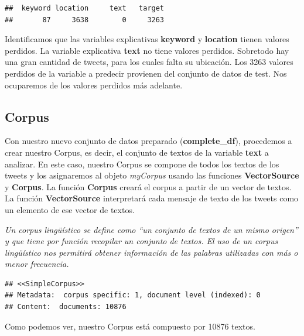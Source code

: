 \documentclass[]{article}
\newenvironment{Shaded}{\begin{snugshade}}{\end{snugshade}}
\newcommand{\KeywordTok}[1]{\textcolor[rgb]{0.13,0.29,0.53}{\textbf{#1}}}
\newcommand{\NormalTok}[1]{#1}
\newcommand{\OperatorTok}[1]{\textcolor[rgb]{0.81,0.36,0.00}{\textbf{#1}}}
\newcommand{\StringTok}[1]{\textcolor[rgb]{0.31,0.60,0.02}{#1}}
\begin{document}
\begin{verbatim}
##  keyword location     text   target 
##       87     3638        0     3263
\end{verbatim}

Identificamos que las variables explicativas \textbf{keyword} y
\textbf{location} tienen valores perdidos. La variable explicativa
\textbf{text} no tiene valores perdidos. Sobretodo hay una gran cantidad
de tweets, para los cuales falta su ubicación. Los 3263 valores perdidos
de la variable a predecir provienen del conjunto de datos de test. Nos
ocuparemos de los valores perdidos más adelante.

\hypertarget{corpus}{%
\subsection{Corpus}\label{corpus}}

Con nuestro nuevo conjunto de datos preparado (\textbf{complete\_df}),
procedemos a crear nuestro Corpus, es decir, el conjunto de textos de la
variable \textbf{text} a analizar. En este caso, nuestro Corpus se
compone de todos los textos de los tweets y los asignaremos al objeto
\emph{myCorpus} usando las funciones \textbf{VectorSource} y
\textbf{Corpus}. La función \textbf{Corpus} creará el corpus a partir de
un vector de textos. La función \textbf{VectorSource} interpretará cada
mensaje de texto de los tweets como un elemento de ese vector de textos.

\emph{Un corpus lingüístico se define como ``un conjunto de textos de un
mismo origen'' y que tiene por función recopilar un conjunto de textos.
El uso de un corpus lingüístico nos permitirá obtener información de las
palabras utilizadas con más o menor frecuencia.}

\begin{Shaded}
\end{Shaded}

\begin{verbatim}
## <<SimpleCorpus>>
## Metadata:  corpus specific: 1, document level (indexed): 0
## Content:  documents: 10876
\end{verbatim}

Como podemos ver, nuestro Corpus está compuesto por 10876 textos.
\end{document}
